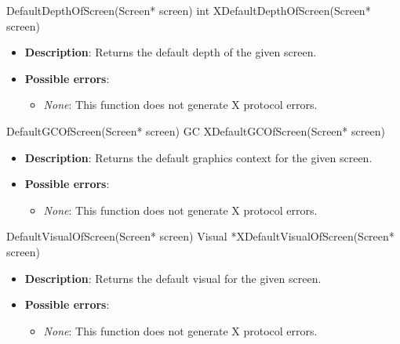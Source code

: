 \documentclass{report}
\begin{document}
\begin{itemize}
        \begin{cppcode}
            DefaultDepthOfScreen(Screen* screen)
            int XDefaultDepthOfScreen(Screen* screen)
        \end{cppcode}
        \begin{itemize}
            \item \textbf{Description}: Returns the default depth of the given screen.
            \item \textbf{Possible errors}:
                \begin{itemize}
                    \item \textit{None}: This function does not generate X protocol errors.
                \end{itemize}
        \end{itemize}

        \begin{cppcode}
            DefaultGCOfScreen(Screen* screen)
            GC XDefaultGCOfScreen(Screen* screen)
        \end{cppcode}
        \begin{itemize}
            \item \textbf{Description}: Returns the default graphics context for the given screen.
            \item \textbf{Possible errors}:
                \begin{itemize}
                    \item \textit{None}: This function does not generate X protocol errors.
                \end{itemize}
        \end{itemize}

        \begin{cppcode}
            DefaultVisualOfScreen(Screen* screen)
            Visual *XDefaultVisualOfScreen(Screen* screen)
        \end{cppcode}
        \begin{itemize}
            \item \textbf{Description}: Returns the default visual for the given screen.
            \item \textbf{Possible errors}:
                \begin{itemize}
                    \item \textit{None}: This function does not generate X protocol errors.
                \end{itemize}
        \end{itemize}


\end{itemize}
\end{document}
